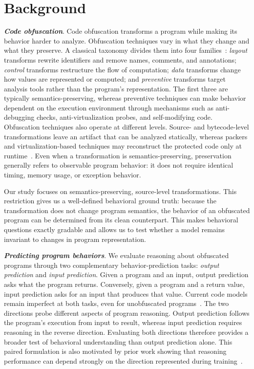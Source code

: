 \section{Background}
\label{sec:background}

{\bf \em Code obfuscation}. Code obfuscation transforms a program while making its behavior harder to analyze. Obfuscation techniques vary in what they change and what they preserve. A classical taxonomy divides them into four families~\cite{collberg1997taxonomy,collberg2002manufacturing}: \emph{layout} transforms rewrite identifiers and remove names, comments, and annotations; \emph{control} transforms restructure the flow of computation; \emph{data} transforms change how values are represented or computed; and \emph{preventive} transforms target analysis tools rather than the program's representation. The first three are typically semantics-preserving, whereas preventive techniques can make behavior dependent on the execution environment through mechanisms such as anti-debugging checks, anti-virtualization probes, and self-modifying code.
Obfuscation techniques also operate at different levels. Source- and bytecode-level transformations leave an artifact that can be analyzed statically, whereas packers and virtualization-based techniques may reconstruct the protected code only at runtime~\cite{roundy2013packers,schrittwieser2016protecting}. Even when a transformation is semantics-preserving, preservation generally refers to observable program behavior: it does not require identical timing, memory usage, or exception behavior.

Our study focuses on semantics-preserving, source-level transformations. This restriction gives us a well-defined behavioral ground truth: because the transformation does not change program semantics, the behavior of an obfuscated program can be determined from its clean counterpart. This makes behavioral questions exactly gradable and allows us to test whether a model remains invariant to changes in program representation.

{\bf \em Predicting program behaviors}. We evaluate reasoning about obfuscated programs through two complementary behavior-prediction tasks: \emph{output prediction} and \emph{input prediction}. Given a program and an input, output prediction asks what the program returns. Conversely, given a program and a return value, input prediction asks for an input that produces that value. Current code models remain imperfect at both tasks, even for unobfuscated programs~\cite{cruxeval}.
%
The two directions probe different aspects of program reasoning. Output prediction follows the program's execution from input to result, whereas input prediction requires reasoning in the reverse direction. Evaluating both directions therefore provides a broader test of behavioral understanding than output prediction alone. This paired formulation is also motivated by prior work showing that reasoning performance can depend strongly on the direction represented during training~\cite{dexbench,revthink,cft_bidirectional,paired_attrib}.

